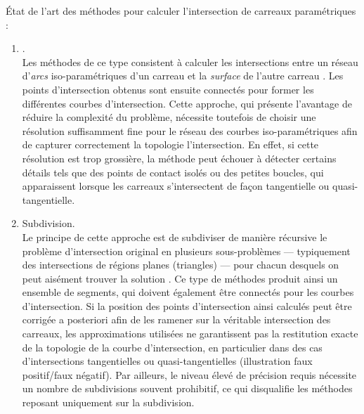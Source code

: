 État de l'art des méthodes pour calculer l'intersection de carreaux paramétriques :
\begin{enumerate}
	\item {}.\\
	Les méthodes de ce type consistent à calculer les intersections entre un réseau d'\textit{arcs} iso-paramétriques d'un carreau et la \textit{surface} de l'autre carreau \cite{rossignac1987}. 
	Les points d'intersection obtenus sont ensuite connectés pour former les différentes courbes d'intersection. 
	Cette approche, qui présente l'avantage de réduire la complexité du problème, nécessite toutefois de choisir une résolution suffisamment fine pour le réseau des courbes iso-paramétriques afin de capturer correctement la topologie l'intersection. 
	En effet, si cette résolution est trop grossière, la méthode peut échouer à détecter certains détails tels que des points de contact isolés ou des petites boucles, qui apparaissent lorsque les carreaux s'intersectent de façon tangentielle ou quasi-tangentielle.
	
	\item Subdivision.\\
	Le principe de cette approche est de subdiviser de manière récursive le problème d'intersection original en plusieurs sous-problèmes --- typiquement des intersections de régions planes (\eg triangles) --- pour chacun desquels on peut aisément trouver la solution \cite{houghton1985}. 
	Ce type de méthodes produit ainsi un ensemble de segments, qui doivent également être connectés pour les courbes d'intersection. 
	Si la position des points d'intersection ainsi calculés peut être corrigée a posteriori afin de les ramener sur la véritable intersection des carreaux, les approximations utilisées ne garantissent pas la restitution exacte de la topologie de la courbe d'intersection, en particulier dans des cas d'intersections tangentielles ou quasi-tangentielles (illustration faux positif/faux négatif).
	Par ailleurs, le niveau élevé de précision requis nécessite un nombre de subdivisions souvent prohibitif, ce qui disqualifie les méthodes reposant uniquement sur la subdivision.


\end{enumerate}
